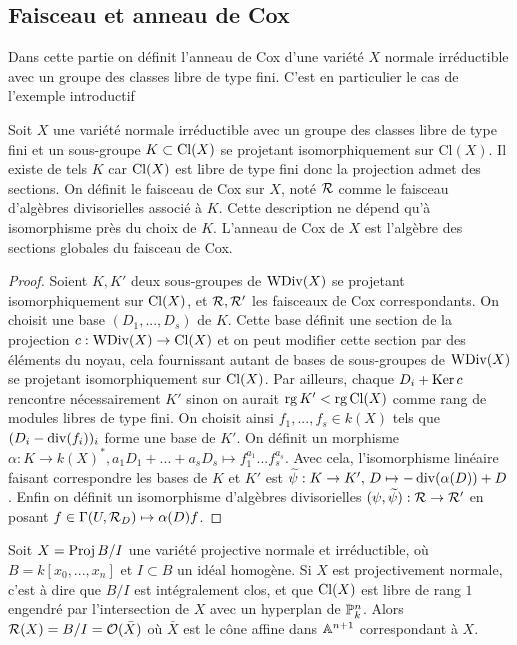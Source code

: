 \subsection{Faisceau et anneau de Cox}

Dans cette partie on définit l'anneau de Cox d'une variété $X$ normale irréductible avec un groupe des classes libre de type fini. C'est en particulier le cas de l'exemple introductif

\begin{cons}\label{consFreeCoxRing}
Soit $X$ une variété normale irréductible avec un groupe des classes libre de type fini et un sous-groupe $K\subset \operatorname{Cl}(X)$ se projetant isomorphiquement sur Cl$(X)$. Il existe de tels $K$ car $\operatorname{Cl}(X)$ est libre de type fini donc la projection admet des sections. On définit le faisceau de Cox sur $X$, noté $\mathcal{R}$ comme le faisceau d'algèbres divisorielles associé à $K$. Cette description ne dépend qu'à isomorphisme près du choix de $K$. L'anneau de Cox de $X$ est l'algèbre des sections globales du faisceau de Cox. 
\end{cons}
\begin{proof}
Soient $K,K'$ deux sous-groupes de $\operatorname{WDiv}(X)$ se projetant isomorphiquement sur $\operatorname{Cl}(X)$, et $\mathcal{R},\mathcal{R}'$ les faisceaux de Cox correspondants. On choisit une base $(D_1,...,D_s)$ de $K$. Cette base définit une section de la projection $c:\operatorname{WDiv}(X)\rightarrow \operatorname{Cl}(X)$ et on peut modifier cette section par des éléments du noyau, cela fournissant autant de bases de sous-groupes de $\operatorname{WDiv}(X)$ se projetant isomorphiquement sur $\operatorname{Cl}(X)$. Par ailleurs, chaque $D_i+\operatorname{Ker} c$ rencontre nécessairement $K'$ sinon on aurait $\operatorname{rg} K' < \operatorname{rg} \operatorname{Cl}(X)$ comme rang de modules libres de type fini. On choisit ainsi $f_1,...,f_s\in k(X)$ tels que $(D_i-\operatorname{div}(f_i))_i$ forme une base de $K'$. On définit un morphisme $\alpha:K\rightarrow k(X)^*, a_1D_1+...+a_sD_s\mapsto f_1^{a_1}...f_s^{a_s}$. Avec cela, l'isomorphisme linéaire faisant correspondre les bases de $K$ et $K'$ est $\widetilde{\psi}:K\rightarrow K',\, D\mapsto -\operatorname{div}(\alpha(D))+D$. Enfin on définit un isomorphisme d'algèbres divisorielles $(\psi, \widetilde{\psi}): \mathcal{R}\rightarrow\mathcal{R}'$ en posant $f\in \Gamma(U, \mathcal{R}_D)\mapsto \alpha(D)f$.
\end{proof}

\begin{ex}
Soit $X=\operatorname{Proj} B/I$ une variété projective normale et irréductible, où $B=k[x_0,...,x_n]$ et $I\subset B$ un idéal homogène. Si $X$ est projectivement normale, c'est à dire que $B/I$ est intégralement clos, et que $\operatorname{Cl}(X)$ est libre de rang $1$ engendré par l'intersection de $X$ avec un hyperplan de $\mathbb{P}^n_k$. Alors $\mathcal{R}(X)=B/I=\mathcal{O}(\bar{X})$ où $\bar{X}$ est le cône affine dans $\mathbb{A}^{n+1}$ correspondant à $X$.
\end{ex}

